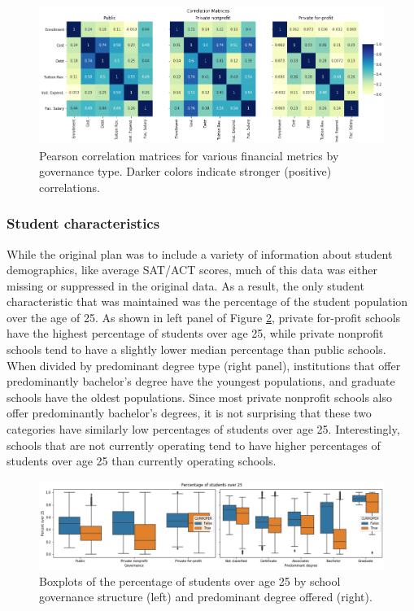 \documentclass[11pt, letterpaper]{article}
\begin{document}
\begin{figure}[h]
\begin{center}
\includegraphics[width=6.5in]{currentFinanceCorrelationHeatmap.png}
\caption{Pearson correlation matrices for various financial metrics by governance type. Darker colors indicate stronger (positive) correlations.} 
\label{fig:Correlation}
\end{center}
\end{figure}

\subsubsection{Student characteristics}
While the original plan was to include a variety of information about student demographics, like average SAT/ACT scores, much of this data was either missing or suppressed in the original data. As a result, the only student characteristic that was maintained was the percentage of the student population over the age of 25. As shown in left panel of Figure \ref{fig:Age}, private for-profit schools have the highest percentage of students over age 25, while private nonprofit schools tend to have a slightly lower median percentage than public schools. When divided by predominant degree type (right panel), institutions that offer predominantly bachelor's degree have the youngest populations, and graduate schools have the oldest populations. Since most private nonprofit schools also offer predominantly bachelor's degrees, it is not surprising that these two categories have similarly low percentages of students over age 25. Interestingly, schools that are not currently operating tend to have higher percentages of students over age 25 than currently operating schools. 

\begin{figure}[h]
\begin{center}
\includegraphics[width=6.5in]{currentOver25Boxes.png}
\caption{Boxplots of the percentage of students over age 25 by school governance structure (left) and predominant degree offered (right).} 
\label{fig:Age}
\end{center}
\end{figure}
\end{document}
